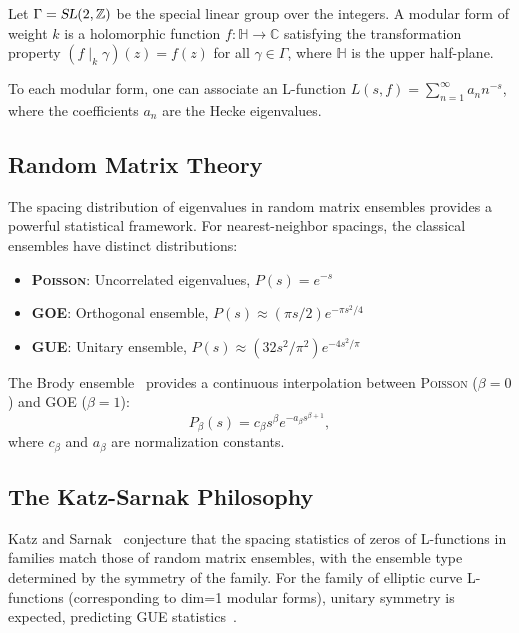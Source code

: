 \documentclass[11pt, a4paper]{article}
\newcommand{\SL}{\textsl{SL}}
\newcommand{\GUE}{\textsc{GUE}}
\newcommand{\GOE}{\textsc{GOE}}
\newcommand{\Poisson}{\textsc{Poisson}}
\begin{document}
Let $\Gamma = \SL(2, \mathbb{Z})$ be the special linear group over the integers. A modular form of weight $k$ is a holomorphic function $f: \mathbb{H} \to \mathbb{C}$ satisfying the transformation property $(f \mid_k \gamma)(z) = f(z)$ for all $\gamma \in \Gamma$, where $\mathbb{H}$ is the upper half-plane.

To each modular form, one can associate an L-function $L(s, f) = \sum_{n=1}^{\infty} a_n n^{-s}$, where the coefficients $a_n$ are the Hecke eigenvalues.

\subsection{Random Matrix Theory}

The spacing distribution of eigenvalues in random matrix ensembles provides a powerful statistical framework. For nearest-neighbor spacings, the classical ensembles have distinct distributions:

\begin{itemize}
\item {\bfseries \Poisson{}}: Uncorrelated eigenvalues, $P(s) = e^{-s}$
\item {\bfseries \GOE{}}: Orthogonal ensemble, $P(s) \approx (\pi s / 2) e^{-\pi s^2 / 4}$
\item {\bfseries \GUE{}}: Unitary ensemble, $P(s) \approx (32 s^2 / \pi^2) e^{-4 s^2 / \pi}$
\end{itemize}

The Brody ensemble~\cite{brody1981} provides a continuous interpolation between \Poisson{} ($\beta=0$) and \GOE{} ($\beta=1$):
\begin{equation}\label{eq:brody}
P_\beta(s) = c_\beta s^\beta e^{-a_\beta s^{\beta+1}},
\end{equation}
where $c_\beta$ and $a_\beta$ are normalization constants.

\subsection{The Katz-Sarnak Philosophy}

Katz and Sarnak~\cite{katzsarnak1999} conjecture that the spacing statistics of zeros of L-functions in families match those of random matrix ensembles, with the ensemble type determined by the symmetry of the family. For the family of elliptic curve L-functions (corresponding to dim=1 modular forms), unitary symmetry is expected, predicting \GUE{} statistics~\cite{rudnicksarnak1996}.
\end{document}
